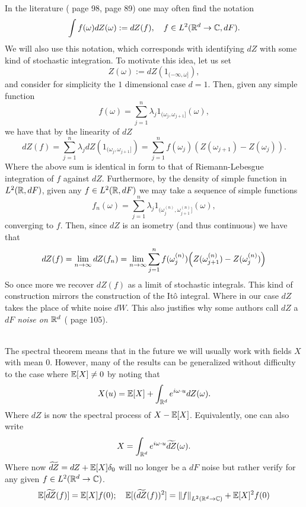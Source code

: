 \documentclass[
    a4paper,
    DIV=14,
    abstract=true,
    numbers=noenddot
]{scrartcl}
\begin{document}
In the literature (\cite{yaglom1987correlation} page 98, \cite{lindgren2012stationary} page 89) one may often find the notation
\begin{equation*}
	\int f(\omega)dZ(\omega):=dZ(f),\quad f\in L^2(\mathbb{R}^d\to\mathbb{C},dF).
\end{equation*}
We will also use this notation, which corresponds with identifying $dZ$ with some kind of stochastic integration. To motivate this idea, let us set
\begin{equation}\label{Z def}
	Z(\omega):=dZ(1_{(-\infty,\omega]}),
\end{equation}
and consider for simplicity the $1$ dimensional case $d=1$. Then, given any simple function
$$f(\omega)=\sum_{j=1}^{n}  \lambda_{j} 1_{(\omega_j,\omega_{j+1}]}(\omega),$$
we have that by the linearity of $dZ$
\begin{equation*}
	dZ(f)=\sum_{j=1}^n\lambda_j dZ(1_{(\omega_j,\omega_{j+1}]})=\sum_{j=1}^n f(\omega_j) (Z(\omega_{j+1})-Z(\omega_j)).
\end{equation*}
Where the above sum is identical in form to that of Riemann-Lebesgue integration of $f$ against $dZ$. Furthermore, by the density of simple function in $L^2(\mathbb{R},dF)$, given any $f\in L^2(\mathbb{R},dF)$ we may take a sequence of simple functions $$f_n(\omega)=\sum_{j=1}^{n}  \lambda_{j} 1_{(\omega_j^{(n)},\omega^{(n)}_{j+1}]}(\omega),$$ converging to $f$. Then, since $dZ$ is an isometry (and thus continuous) we have that
\begin{equation}\label{approx stoch int}
	dZ(f)=\lim_{n\to\infty} dZ(f_n)=\lim_{n\to\infty}\sum_{j=1}^n f(\omega^{(n)}_j)\qty (Z(\omega^{(n)}_{j+1})-Z(\omega^{(n)}_j))
\end{equation}
So once more we recover $dZ(f)$ as a limit of stochastic integrals. This kind of construction mirrors the construction of the Itô integral. Where in our case $dZ$ takes the place of white noise $dW$. This also justifies why some authors call $dZ$ a \emph{$dF$ noise on $\mathbb{R}^d$} (\cite{adler2007random} page 105).\\
\\
\begin{observation}\label{obs 1}
	The spectral theorem means that in the future we will usually work with fields $X$ with mean $0$. However, many of the results can be generalized without difficulty to the case where $\mathbb{E}[X]\neq 0$ by noting that
	\begin{equation*}
		X(u)=\mathbb{E}[X]+\int_{\mathbb{R}^d}e^{i\omega\cdot u}dZ(\omega).
	\end{equation*}
	Where $dZ$ is now the spectral process of $X-\mathbb{E}[X]$. Equivalently, one can also write
	\begin{equation*}
		X=\int_{\mathbb{R}^d}e^{i\omega\cdot u}\widetilde{dZ}(\omega).
	\end{equation*}
	Where now $\widetilde{dZ}=dZ+\mathbb{E}[X]\delta_0$ will no longer be a $dF$ noise but rather verify for any given $f\in L^2(\mathbb{R}^d\to\mathbb{C})$.
	\begin{equation*}
		\mathbb{E}[\widetilde{dZ}(f)]=\mathbb{E}[X]f(0);\quad \mathbb{E}[(\widetilde{dZ}(f))^2]=\left\lVert f \right\rVert_{L^2(\mathbb{R}^d\to\mathbb{C})}+\mathbb{E}[X]^2f(0)
	\end{equation*}
\end{observation}
\end{document}
